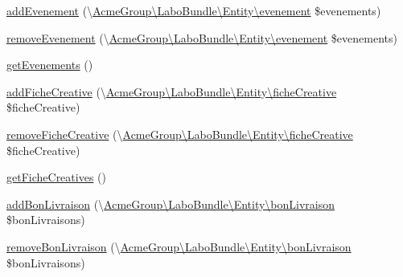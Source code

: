 \begin{DoxyCompactItemize}
\item 
\hyperlink{class_acme_group_1_1_user_bundle_1_1_entity_1_1_user_a2113349911cb2456371f00e11fd6704d}{add\+Evenement} (\textbackslash{}\hyperlink{class_acme_group_1_1_labo_bundle_1_1_entity_1_1evenement}{Acme\+Group\textbackslash{}\+Labo\+Bundle\textbackslash{}\+Entity\textbackslash{}evenement} \$evenements)
\item 
\hyperlink{class_acme_group_1_1_user_bundle_1_1_entity_1_1_user_a447852084878cb79a1b2c826198f3186}{remove\+Evenement} (\textbackslash{}\hyperlink{class_acme_group_1_1_labo_bundle_1_1_entity_1_1evenement}{Acme\+Group\textbackslash{}\+Labo\+Bundle\textbackslash{}\+Entity\textbackslash{}evenement} \$evenements)
\item 
\hyperlink{class_acme_group_1_1_user_bundle_1_1_entity_1_1_user_a0b7d8e3970ae87e86052a2cb9a729b2f}{get\+Evenements} ()
\item 
\hyperlink{class_acme_group_1_1_user_bundle_1_1_entity_1_1_user_a5c0732d302287762f30d288bf70d0acb}{add\+Fiche\+Creative} (\textbackslash{}\hyperlink{class_acme_group_1_1_labo_bundle_1_1_entity_1_1fiche_creative}{Acme\+Group\textbackslash{}\+Labo\+Bundle\textbackslash{}\+Entity\textbackslash{}fiche\+Creative} \$fiche\+Creative)
\item 
\hyperlink{class_acme_group_1_1_user_bundle_1_1_entity_1_1_user_a463f10f16cdd37387e047a2f23892bec}{remove\+Fiche\+Creative} (\textbackslash{}\hyperlink{class_acme_group_1_1_labo_bundle_1_1_entity_1_1fiche_creative}{Acme\+Group\textbackslash{}\+Labo\+Bundle\textbackslash{}\+Entity\textbackslash{}fiche\+Creative} \$fiche\+Creative)
\item 
\hyperlink{class_acme_group_1_1_user_bundle_1_1_entity_1_1_user_a86ef1bb1aad0ca617b6fccbd81d58780}{get\+Fiche\+Creatives} ()
\item 
\hyperlink{class_acme_group_1_1_user_bundle_1_1_entity_1_1_user_a324981d1b9d046c8b1f0fbd663044934}{add\+Bon\+Livraison} (\textbackslash{}\hyperlink{class_acme_group_1_1_labo_bundle_1_1_entity_1_1bon_livraison}{Acme\+Group\textbackslash{}\+Labo\+Bundle\textbackslash{}\+Entity\textbackslash{}bon\+Livraison} \$bon\+Livraisons)
\item 
\hyperlink{class_acme_group_1_1_user_bundle_1_1_entity_1_1_user_a4feab60a504c0dcb627f75dc18e6ad13}{remove\+Bon\+Livraison} (\textbackslash{}\hyperlink{class_acme_group_1_1_labo_bundle_1_1_entity_1_1bon_livraison}{Acme\+Group\textbackslash{}\+Labo\+Bundle\textbackslash{}\+Entity\textbackslash{}bon\+Livraison} \$bon\+Livraisons)
\item 

\end{DoxyCompactItemize}

